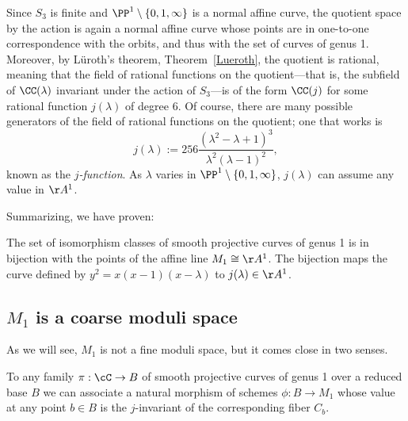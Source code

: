 Since $S_3$ is finite and $\PP^1 \setminus \{0,1,\infty\}$ is a normal affine curve, the quotient space by the action is again a normal affine curve whose points are in one-to-one
correspondence with the orbits, and thus with the set of curves of genus 1. 
 Moreover, by L\"uroth's theorem, Theorem~\ref{Lueroth}, the quotient is rational, meaning that the field of rational functions on the quotient---that is, the subfield of $\CC(\lambda)$ invariant under the action of $S_3$---is of the form $\CC(j)$ for some rational function $j(\lambda)$ of degree 6. Of course, there are many possible generators of the field of rational functions on the quotient; one that works is
\begin{equation}\label{formula for j}
j(\lambda) := 256\frac{(\lambda^2-\lambda + 1)^3}{\lambda^2(\lambda-1)^2},
\end{equation}
known as the \emph{$j$-function}. As $\lambda$ varies in $\PP^1 \setminus \{0,1,\infty\}$, $j(\lambda)$ can assume any value in $\AA^1$.
 
 

Summarizing, we have proven:

\begin{theorem}
The set of isomorphism classes of smooth projective curves of genus 1 is in bijection with the points of the affine line $M_1 \cong \AA^1$. The bijection maps the curve defined by $y^2 = x(x-1)(x-\lambda)$
to  $j(\lambda)\in \AA^1$.
\end{theorem}

\subsection{$M_1$ is a coarse moduli space}

 As we will see,
$M_1$ is not a fine moduli space, but it comes close in two senses. 

\begin{proposition}\label{M1 is coarse}
To any family $\pi : \cC \to B$  of smooth projective curves of genus 1 over a reduced base $B$ we can associate a natural morphism of schemes $\phi : B \to M_1$ whose value at any point $b \in B$ is the $j$-invariant of the corresponding fiber $C_b$.
\end{proposition} 

